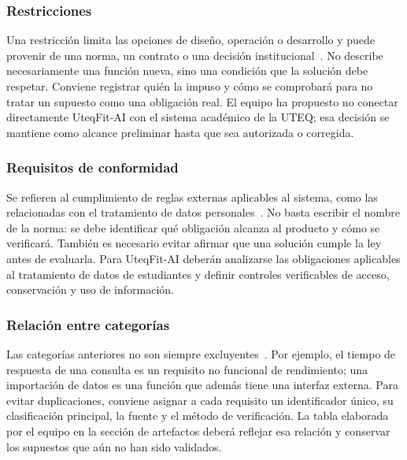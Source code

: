 \subsubsection{Restricciones}
Una restricción limita las opciones de diseño, operación o desarrollo y puede provenir de una norma, un contrato o una decisión institucional~\cite{ieee29148}. No describe necesariamente una función nueva, sino una condición que la solución debe respetar. Conviene registrar quién la impuso y cómo se comprobará para no tratar un supuesto como una obligación real. El equipo ha propuesto no conectar directamente UteqFit-AI con el sistema académico de la UTEQ; esa decisión se mantiene como alcance preliminar hasta que sea autorizada o corregida.

\subsubsection{Requisitos de conformidad}
Se refieren al cumplimiento de reglas externas aplicables al sistema, como las relacionadas con el tratamiento de datos personales~\cite{ieee29148}. No basta escribir el nombre de la norma: se debe identificar qué obligación alcanza al producto y cómo se verificará. También es necesario evitar afirmar que una solución cumple la ley antes de evaluarla. Para UteqFit-AI deberán analizarse las obligaciones aplicables al tratamiento de datos de estudiantes y definir controles verificables de acceso, conservación y uso de información.

\subsubsection{Relación entre categorías}
Las categorías anteriores no son siempre excluyentes~\cite{swebok2024}. Por ejemplo, el tiempo de respuesta de una consulta es un requisito no funcional de rendimiento; una importación de datos es una función que además tiene una interfaz externa. Para evitar duplicaciones, conviene asignar a cada requisito un identificador único, su clasificación principal, la fuente y el método de verificación. La tabla elaborada por el equipo en la sección de artefactos deberá reflejar esa relación y conservar los supuestos que aún no han sido validados.

